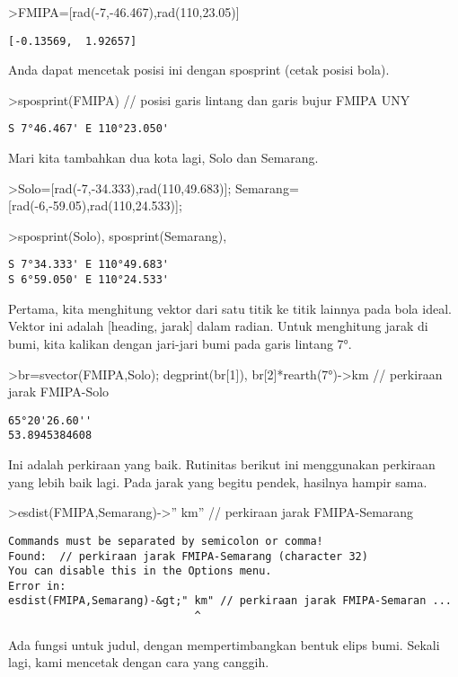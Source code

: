 \documentclass[
]{book}
\begin{document}
\textgreater FMIPA={[}rad(-7,-46.467),rad(110,23.05){]}

\begin{verbatim}
[-0.13569,  1.92657]
\end{verbatim}

Anda dapat mencetak posisi ini dengan sposprint (cetak posisi bola).

\textgreater sposprint(FMIPA) // posisi garis lintang dan garis bujur FMIPA UNY

\begin{verbatim}
S 7°46.467' E 110°23.050'
\end{verbatim}

Mari kita tambahkan dua kota lagi, Solo dan Semarang.

\textgreater Solo={[}rad(-7,-34.333),rad(110,49.683){]}; Semarang={[}rad(-6,-59.05),rad(110,24.533){]};

\textgreater sposprint(Solo), sposprint(Semarang),

\begin{verbatim}
S 7°34.333' E 110°49.683'
S 6°59.050' E 110°24.533'
\end{verbatim}

Pertama, kita menghitung vektor dari satu titik ke titik lainnya pada bola ideal. Vektor ini adalah {[}heading, jarak{]} dalam radian. Untuk menghitung jarak di bumi, kita kalikan dengan jari-jari bumi pada garis lintang 7°.

\textgreater br=svector(FMIPA,Solo); degprint(br{[}1{]}), br{[}2{]}*rearth(7°)-\textgreater km // perkiraan jarak FMIPA-Solo

\begin{verbatim}
65°20'26.60''
53.8945384608
\end{verbatim}

Ini adalah perkiraan yang baik. Rutinitas berikut ini menggunakan perkiraan yang lebih baik lagi. Pada jarak yang begitu pendek, hasilnya hampir sama.

\textgreater esdist(FMIPA,Semarang)-\textgreater'' km'' // perkiraan jarak FMIPA-Semarang

\begin{verbatim}
Commands must be separated by semicolon or comma!
Found:  // perkiraan jarak FMIPA-Semarang (character 32)
You can disable this in the Options menu.
Error in:
esdist(FMIPA,Semarang)-&gt;" km" // perkiraan jarak FMIPA-Semaran ...
                             ^
\end{verbatim}

Ada fungsi untuk judul, dengan mempertimbangkan bentuk elips bumi. Sekali lagi, kami mencetak dengan cara yang canggih.
\end{document}
